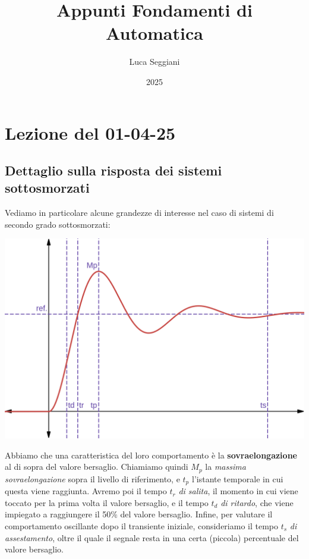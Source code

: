 \documentclass[a4paper,11pt]{article}
\title{Appunti Fondamenti di Automatica}
\author{Luca Seggiani}
\date{2025}
\begin{document}
\section{Lezione del 01-04-25}

\thispagestyle{empty}
\pagestyle{fancy}

\noindent
\begin{minipage}{\textwidth}
\subsection{Dettaglio sulla risposta dei sistemi sottosmorzati}
Vediamo in particolare alcune grandezze di interesse nel caso di sistemi di secondo grado sottosmorzati:

\par\bigskip

\begin{center}
\includegraphics[scale=0.29]{../figures/damped_oscillator.png}
\end{center}
\end{minipage}

\par\bigskip

Abbiamo che una caratteristica del loro comportamento è la \textbf{sovraelongazione} al di sopra del valore bersaglio.
Chiamiamo quindi $M_p$ la \textit{massima sovraelongazione} sopra il livello di riferimento, e $t_p$ l'istante temporale in cui questa viene raggiunta.
Avremo poi il tempo $t_r$ \textit{di salita}, il momento in cui viene toccato per la prima volta il valore bersaglio, e il tempo $t_d$ \textit{di ritardo}, che viene impiegato a raggiungere il 50\% del valore bersaglio.
Infine, per valutare il comportamento oscillante dopo il transiente iniziale, consideriamo il tempo $t_s$ \textit{di assestamento}, oltre il quale il segnale resta in una certa (piccola) percentuale del valore bersaglio.
\end{document}
